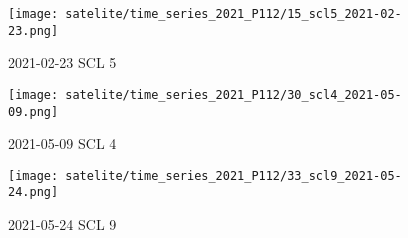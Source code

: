 
\begin{figure*}
	\centering
	\begin{subfigure}[b]{0.31\textwidth}
		\centering
		\texttt{[image: satelite/time\_series\_2021\_P112/15\_scl5\_2021-02-23.png]}
		\caption[2021-02-23\hspace*{0.1cm} SCL 5]%
		{{\small 2021-02-23\hspace*{0.1cm} SCL 5}}    
		\label{fig:satelite/time_series_2021_P112/15_scl5_2021-02-23.png}
	\end{subfigure}
	\hfill
	\begin{subfigure}[b]{0.31\textwidth}  
		\centering 
		\texttt{[image: satelite/time\_series\_2021\_P112/30\_scl4\_2021-05-09.png]}
		\caption[2021-05-09\hspace*{0.1cm} SCL 4]%
		{{\small 2021-05-09\hspace*{0.1cm} SCL 4}}    
		\label{fig:satelite/time_series_2021_P112/30_scl4_2021-05-09.png}
	\end{subfigure}
	\hfill
	\begin{subfigure}[b]{0.31\textwidth}  
		\centering 
		\texttt{[image: satelite/time\_series\_2021\_P112/33\_scl9\_2021-05-24.png]}
		\caption[2021-05-24\hspace*{0.1cm} SCL 9]%
		{{\small 2021-05-24\hspace*{0.1cm} SCL 9}}    
		\label{fig:satelite/time_series_2021_P112/33_scl9_2021-05-24.png}
	\end{subfigure}


\end{figure*}
